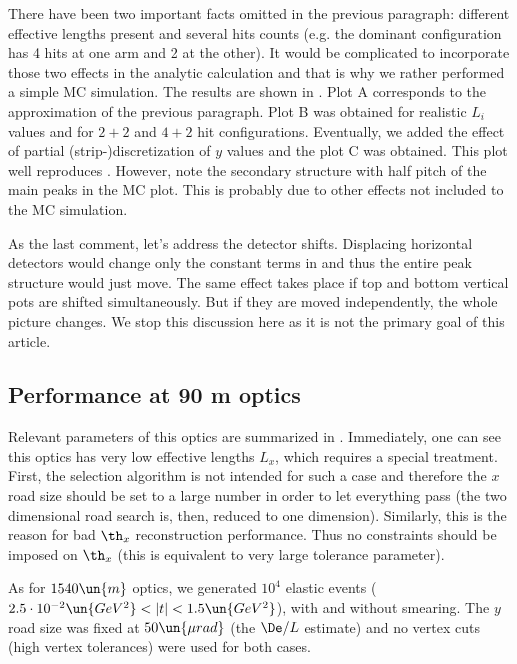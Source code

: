 There have been two important facts omitted in the previous paragraph: different effective lengths present and several hits counts (e.g. the dominant configuration has 4 hits at one arm and 2 at the other). It would be complicated to incorporate those two effects in the analytic calculation and that is why we rather performed a simple MC simulation. The results are shown in . Plot A corresponds to the approximation of the previous paragraph. Plot B was obtained for realistic $L_i$ values and for $2+2$ and $4+2$ hit configurations. Eventually, we added the effect of partial (strip-)discretization of $y$ values and the plot C was obtained. This plot well reproduces . However, note the secondary structure with half pitch of the main peaks in the MC plot. This is probably due to other effects not included to the MC simulation.

As the last comment, let's address the detector shifts. Displacing horizontal detectors would change only the constant terms in  and thus the entire peak structure would just move. The same effect takes place if top and bottom vertical pots are shifted simultaneously. But if they are moved independently, the whole picture changes. We stop this discussion here as it is not the primary goal of this article.






\subsection[90]{Performance at 90 m optics}

Relevant parameters of this optics are summarized in . Immediately, one can see this optics has very low effective lengths $L_x$, which requires a special treatment. First, the selection algorithm is not intended for such a case and therefore the $x$ road size should be set to a large number in order to let everything pass (the two dimensional road search is, then, reduced to one dimension). Similarly, this is the reason for bad $\th_x$ reconstruction performance. Thus no constraints should be imposed on $\th_x$ (this is equivalent to very large tolerance parameter).

As for $1540\un{m}$ optics, we generated $10^4$ elastic events ($2.5\cdot10^{-2}\un{GeV^2} < |t| < 1.5\un{GeV^2}$), with and without smearing. The $y$ road size was fixed at $50\un{\mu rad}$ (the $\De/L$ estimate) and no vertex cuts (high vertex tolerances) were used for both cases.

